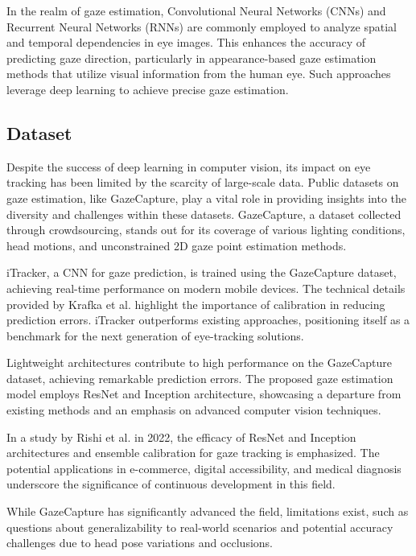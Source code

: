 \documentclass[conference]{IEEEtran}
\begin{document}
In the realm of gaze estimation, Convolutional Neural Networks (CNNs) and Recurrent Neural Networks (RNNs) are commonly employed to analyze spatial and temporal dependencies in eye images. This enhances the accuracy of predicting gaze direction, particularly in appearance-based gaze estimation\cite{review_benchmark} methods that utilize visual information from the human eye. Such approaches leverage deep learning to achieve precise gaze estimation.

\subsection{Dataset}\label{AA}
Despite the success of deep learning in computer vision, its impact on eye tracking has been limited by the scarcity of large-scale data. Public datasets on gaze estimation, like GazeCapture, play a vital role in providing insights into the diversity and challenges within these datasets. GazeCapture, a dataset collected through crowdsourcing\cite{gazecapture-1}, stands out for its coverage of various lighting conditions, head motions, and unconstrained 2D gaze point estimation methods.

iTracker\cite{gazecapture-1}, a CNN for gaze prediction, is trained using the GazeCapture dataset, achieving real-time performance on modern mobile devices. The technical details provided by Krafka et al. highlight the importance of calibration in reducing prediction errors\cite{gazecapture-1}. iTracker outperforms existing approaches\cite{review_benchmark}, positioning itself as a benchmark for the next generation of eye-tracking solutions.

Lightweight architectures contribute to high performance on the GazeCapture dataset, achieving remarkable prediction errors. The proposed gaze estimation model employs ResNet and Inception architecture\cite{gazecapture-2}, showcasing a departure from existing methods and an emphasis on advanced computer vision techniques. 

In a study by Rishi et al. in 2022, the efficacy of ResNet and Inception architectures\cite{gazecapture-2} and ensemble calibration for gaze tracking is emphasized. The potential applications in e-commerce, digital accessibility, and medical diagnosis underscore the significance of continuous development in this field.

While GazeCapture\cite{gazecapture-1} has significantly advanced the field, limitations exist, such as questions about generalizability to real-world scenarios and potential accuracy challenges due to head pose variations\cite{gazecapture-1} and occlusions. 
\end{document}
